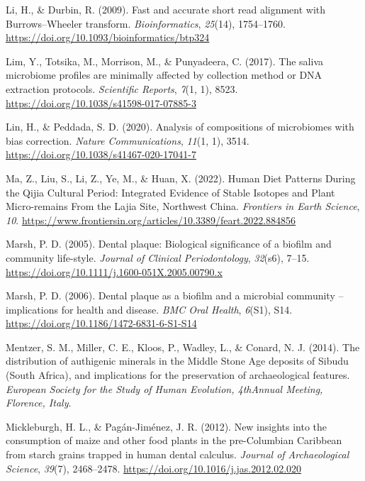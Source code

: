 \documentclass[
  letterpaper,
]{book}
\newlength{\cslhangindent}
\newlength{\cslentryspacingunit} %
\newenvironment{CSLReferences}[2] %
 {%
  \setlength{\parindent}{0pt}
  \ifodd #1
  \let\oldpar\par
  \def\par{\hangindent=\cslhangindent\oldpar}
  \fi
  \setlength{\parskip}{#2\cslentryspacingunit}
 }%
 {}
\begin{document}
\begin{CSLReferences}{1}{0}
\leavevmode{}%
Li, H., \& Durbin, R. (2009). Fast and accurate short read alignment
with {Burrows}--{Wheeler} transform. \emph{Bioinformatics},
\emph{25}(14), 1754--1760.
\url{https://doi.org/10.1093/bioinformatics/btp324}

\leavevmode{}%
Lim, Y., Totsika, M., Morrison, M., \& Punyadeera, C. (2017). The saliva
microbiome profiles are minimally affected by collection method or {DNA}
extraction protocols. \emph{Scientific Reports}, \emph{7}(1, 1), 8523.
\url{https://doi.org/10.1038/s41598-017-07885-3}

\leavevmode{}%
Lin, H., \& Peddada, S. D. (2020). Analysis of compositions of
microbiomes with bias correction. \emph{Nature Communications},
\emph{11}(1, 1), 3514. \url{https://doi.org/10.1038/s41467-020-17041-7}

\leavevmode{}%
Ma, Z., Liu, S., Li, Z., Ye, M., \& Huan, X. (2022). Human {Diet
Patterns During} the {Qijia Cultural Period}: {Integrated Evidence} of
{Stable Isotopes} and {Plant Micro-remains From} the {Lajia Site},
{Northwest China}. \emph{Frontiers in Earth Science}, \emph{10}.
\url{https://www.frontiersin.org/articles/10.3389/feart.2022.884856}

\leavevmode{}%
Marsh, P. D. (2005). Dental plaque: Biological significance of a biofilm
and community life-style. \emph{Journal of Clinical Periodontology},
\emph{32}(s6), 7--15.
\url{https://doi.org/10.1111/j.1600-051X.2005.00790.x}

\leavevmode{}%
Marsh, P. D. (2006). Dental plaque as a biofilm and a microbial
community -- implications for health and disease. \emph{BMC Oral
Health}, \emph{6}(S1), S14.
\url{https://doi.org/10.1186/1472-6831-6-S1-S14}

\leavevmode{}%
Mentzer, S. M., Miller, C. E., Kloos, P., Wadley, L., \& Conard, N. J.
(2014). The distribution of authigenic minerals in the {Middle Stone
Age} deposits of {Sibudu} ({South Africa}), and implications for the
preservation of archaeological features. \emph{European Society for the
Study of Human Evolution, {4thAnnual} Meeting, Florence, Italy}.

\leavevmode{}%
Mickleburgh, H. L., \& Pagán-Jiménez, J. R. (2012). New insights into
the consumption of maize and other food plants in the pre-{Columbian
Caribbean} from starch grains trapped in human dental calculus.
\emph{Journal of Archaeological Science}, \emph{39}(7), 2468--2478.
\url{https://doi.org/10.1016/j.jas.2012.02.020}


\end{CSLReferences}
\end{document}

